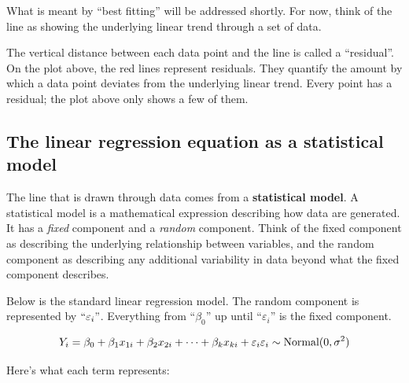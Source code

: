 \documentclass[
  letterpaper,
  DIV=11,
  numbers=noendperiod]{scrreprt}
\begin{document}
What is meant by ``best fitting'' will be addressed shortly. For now,
think of the line as showing the underlying linear trend through a set
of data.

The vertical distance between each data point and the line is called a
``residual''. On the plot above, the red lines represent residuals. They
quantify the amount by which a data point deviates from the underlying
linear trend. Every point has a residual; the plot above only shows a
few of them.

\hypertarget{the-linear-regression-equation-as-a-statistical-model}{%
\subsection{The linear regression equation as a statistical
model}\label{the-linear-regression-equation-as-a-statistical-model}}

The line that is drawn through data comes from a \textbf{statistical
model}. A statistical model is a mathematical expression describing how
data are generated. It has a \emph{fixed} component and a \emph{random}
component. Think of the fixed component as describing the underlying
relationship between variables, and the random component as describing
any additional variability in data beyond what the fixed component
describes.

Below is the standard linear regression model. The random component is
represented by \(``\varepsilon_i"\). Everything from ``\(\beta_0\)'' up
until ``\(\varepsilon_i\)'' is the fixed component.

\[
Y_i=\beta_0+\beta_1x_{1i} + \beta_2x_{2i} + \dots + \beta_kx_{ki} + \varepsilon_i \\
\varepsilon_i \sim \text{Normal}(0,\sigma^2) 
\]

Here's what each term represents:
\end{document}
